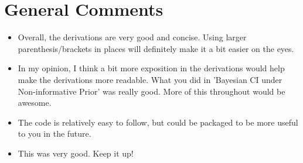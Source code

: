 \documentclass[10pt]{article}
\begin{document}
    \section*{General Comments}

    \begin{itemize}

      \item Overall, the derivations are very good and concise. Using larger parenthesis/brackets in places will definitely make it a bit easier on the eyes.

      \item In my opinion, I think a bit more exposition in the derivations would help make the derivations more readable. What you did in 'Bayesian CI under Non-informative Prior' was really good. More of this throughout would be awesome.

      \item The code is relatively easy to follow, but could be packaged to be more useful to you in the future. 

      \item This was very good. Keep it up!

    \end{itemize}
\end{document}
